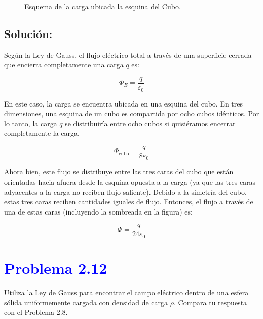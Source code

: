 \documentclass[12pt]{article}
\newcommand{\question}[1]{\textcolor{blue}{\textbf{#1}}}
\begin{document}
\begin{figure}[ht]
    \begin{center}
\end{center}
\caption{Esquema de la carga ubicada la esquina del Cubo.}
\label{fig:figura217}
\end{figure}


\bigskip
\subsection*{Solución:}

Según la Ley de Gauss, el flujo eléctrico total a través de una superficie cerrada que encierra completamente una carga \( q \) es:

\[
\Phi_E = \frac{q}{\varepsilon_0}
\]

En este caso, la carga se encuentra ubicada en una esquina del cubo. En tres dimensiones, una esquina de un cubo es compartida por ocho cubos idénticos. Por lo tanto, la carga \( q \) se distribuiría entre ocho cubos si quisiéramos encerrar completamente la carga.

\[
\Phi_{\text{cubo}} = \frac{q}{8\varepsilon_0}
\]

Ahora bien, este flujo se distribuye entre las tres caras del cubo que están orientadas hacia afuera desde la esquina opuesta a la carga (ya que las tres caras adyacentes a la carga no reciben flujo saliente). Debido a la simetría del cubo, estas tres caras reciben cantidades iguales de flujo. Entonces, el flujo a través de una de estas caras (incluyendo la sombreada en la figura) es:

\[
\boxed{\Phi = \frac{q}{24\varepsilon_0}}
\]

\section*{\question{ Problema 2.12}} 
 Utiliza la Ley de Gauss para encontrar el campo eléctrico dentro de una esfera sólida uniformemente cargada con densidad de carga \( \rho \). Compara tu respuesta con el Problema 2.8.
\end{document}
